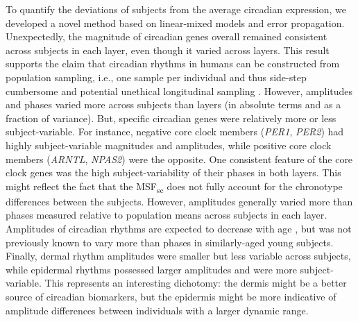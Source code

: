 To quantify the deviations of subjects from the average circadian expression, we developed a novel method based on linear-mixed models and error propagation. Unexpectedly, the magnitude of circadian genes overall remained consistent across subjects in each layer, even though it varied across layers. This result supports the claim that circadian rhythms in humans can be constructed from population sampling, i.e., one sample per individual and thus side-step cumbersome and potential unethical longitudinal sampling \cite{Anafi2017,Wu2018,Ruben2018}. However, amplitudes and phases varied more across subjects than layers (in absolute terms and as a fraction of variance). But, specific circadian genes were relatively more or less subject-variable. For instance, negative core clock members (\textit{PER1}, \textit{PER2}) had highly subject-variable magnitudes and amplitudes, while positive core clock members (\textit{ARNTL}, \textit{NPAS2}) were the opposite. One consistent feature of the core clock genes was the high subject-variability of their phases in both layers. This might reflect the fact that the MSF\textsubscript{sc} does not fully account for the chronotype differences between the subjects. However, amplitudes generally varied more than phases measured relative to population means across subjects in each layer. Amplitudes of circadian rhythms are expected to decrease with age \cite{Blacher2022}, but was not previously known to vary more than phases in similarly-aged young subjects. Finally, dermal rhythm amplitudes were smaller but less variable across subjects, while epidermal rhythms possessed larger amplitudes and were more subject-variable. This represents an interesting dichotomy: the dermis might be a better source of circadian biomarkers, but the epidermis might be more indicative of amplitude differences between individuals with a larger dynamic range.%


